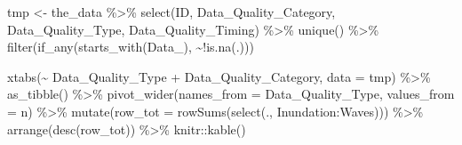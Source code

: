 \documentclass[
]{article}
\newenvironment{Shaded}{\begin{snugshade}}{\end{snugshade}}
\newcommand{\AttributeTok}[1]{\textcolor[rgb]{0.77,0.63,0.00}{#1}}
\newcommand{\FunctionTok}[1]{\textcolor[rgb]{0.00,0.00,0.00}{#1}}
\newcommand{\NormalTok}[1]{#1}
\newcommand{\OtherTok}[1]{\textcolor[rgb]{0.56,0.35,0.01}{#1}}
\newcommand{\SpecialCharTok}[1]{\textcolor[rgb]{0.00,0.00,0.00}{#1}}
\newcommand{\StringTok}[1]{\textcolor[rgb]{0.31,0.60,0.02}{#1}}
\begin{document}
\begin{Shaded}
\begin{Highlighting}[]
\NormalTok{tmp }\OtherTok{\textless{}{-}}\NormalTok{ the\_data }\SpecialCharTok{\%\textgreater{}\%}
  \FunctionTok{select}\NormalTok{(ID, Data\_Quality\_Category, Data\_Quality\_Type, Data\_Quality\_Timing) }\SpecialCharTok{\%\textgreater{}\%}
  \FunctionTok{unique}\NormalTok{() }\SpecialCharTok{\%\textgreater{}\%}
  \FunctionTok{filter}\NormalTok{(}\FunctionTok{if\_any}\NormalTok{(}\FunctionTok{starts\_with}\NormalTok{(}\StringTok{\textquotesingle{}Data\_\textquotesingle{}}\NormalTok{), }\SpecialCharTok{\textasciitilde{}!}\FunctionTok{is.na}\NormalTok{(.)))}

\FunctionTok{xtabs}\NormalTok{(}\SpecialCharTok{\textasciitilde{}}\NormalTok{  Data\_Quality\_Type }\SpecialCharTok{+}\NormalTok{ Data\_Quality\_Category, }\AttributeTok{data =}\NormalTok{ tmp) }\SpecialCharTok{\%\textgreater{}\%}
  \FunctionTok{as\_tibble}\NormalTok{() }\SpecialCharTok{\%\textgreater{}\%}
  \FunctionTok{pivot\_wider}\NormalTok{(}\AttributeTok{names\_from =}\NormalTok{ Data\_Quality\_Type, }\AttributeTok{values\_from =}\NormalTok{ n) }\SpecialCharTok{\%\textgreater{}\%}
  \FunctionTok{mutate}\NormalTok{(}\AttributeTok{row\_tot =} \FunctionTok{rowSums}\NormalTok{(}\FunctionTok{select}\NormalTok{(., }\StringTok{\textasciigrave{}}\AttributeTok{Inundation}\StringTok{\textasciigrave{}}\SpecialCharTok{:}\StringTok{\textasciigrave{}}\AttributeTok{Waves}\StringTok{\textasciigrave{}}\NormalTok{))) }\SpecialCharTok{\%\textgreater{}\%}
  \FunctionTok{arrange}\NormalTok{(}\FunctionTok{desc}\NormalTok{(row\_tot)) }\SpecialCharTok{\%\textgreater{}\%}
\NormalTok{  knitr}\SpecialCharTok{::}\FunctionTok{kable}\NormalTok{()}
\end{Highlighting}
\end{Shaded}
\end{document}
